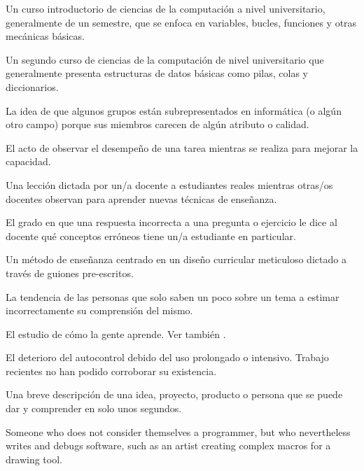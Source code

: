 \begin{description}
 Un curso introductorio de ciencias de la computación a nivel universitario, 
generalmente de un semestre, que se enfoca en variables, bucles, funciones y otras mecánicas básicas.

 Un segundo curso de ciencias de la computación de nivel universitario 
que generalmente presenta estructuras de datos básicas como pilas, colas y diccionarios.

 La idea de que algunos grupos 
están subrepresentados en informática (o algún otro campo) porque sus miembros 
carecen de algún atributo o calidad.

 El acto de observar el desempeño 
de una tarea mientras se realiza para mejorar la capacidad.

 Una lección dictada por un/a docente a estudiantes reales 
mientras otras/os docentes observan para aprender nuevas técnicas de enseñanza.

 El grado en que una respuesta incorrecta 
a una pregunta o ejercicio le dice al docente qué conceptos erróneos tiene un/a estudiante en particular.

 Un método de enseñanza centrado 
en un diseño curricular meticuloso dictado a través de guiones pre-escritos.

 La tendencia de las personas que solo saben 
un poco sobre un tema a estimar incorrectamente su comprensión del mismo.

 El estudio de cómo
la gente aprende. Ver también .

 El deterioro del autocontrol debido del uso prolongado o intensivo. 
Trabajo recientes no han podido corroborar su existencia.

 Una breve descripción de una idea, 
proyecto, producto o persona que se puede dar y comprender en solo unos segundos.

 Someone who does not
consider themselves a programmer, but who nevertheless writes and debugs
software, such as an artist creating complex macros for a drawing tool.


\end{description}

